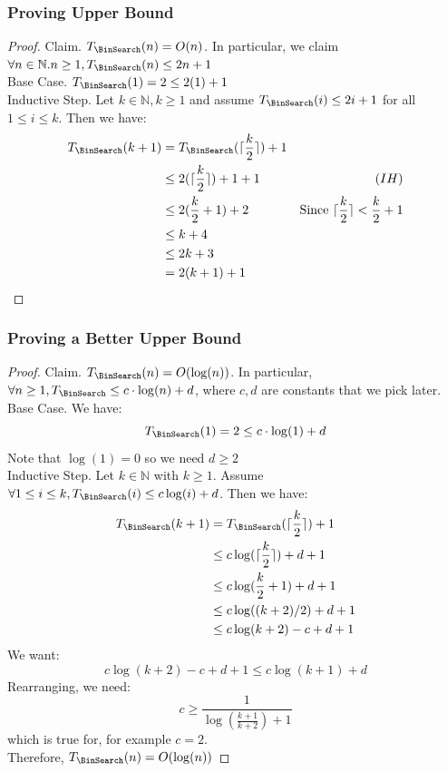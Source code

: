 \documentclass{article}
\begin{document}
\subsubsection{Proving Upper Bound}
    \begin{proof}
    Claim. $T_{\BinSearch}(n) = O(n)$. In particular, we claim $\forall n \in \mathbb{N}. n \geq 1, T_{\BinSearch}(n) \leq 2n + 1$\\
    Base Case. $T_{\BinSearch}(1) = 2 \leq 2(1) + 1$\\
    Inductive Step. Let $k \in \mathbb{N}, k \geq 1$ and assume $T_{\BinSearch}(i) \leq 2i + 1$ for all $1 \leq i \leq k$. Then we have:
    \begin{align*}
        T_{\BinSearch}(k + 1) & = T_{\BinSearch}(\lceil \frac{k}{2} \rceil ) + 1\\
        & \leq 2(\lceil \frac{k}{2} \rceil) + 1 + 1 & (IH)\\
        & \leq 2(\frac{k}{2} + 1) + 2 & \text{Since }\lceil \frac{k}{2} \rceil < \frac{k}{2} + 1\\
        & \leq k + 4\\
        & \leq 2k + 3\\
        & = 2(k + 1) + 1
    \end{align*}
    \end{proof}

\subsubsection{Proving a Better Upper Bound}
    \begin{proof}
    Claim. $T_{\BinSearch}(n) = O(\log(n))$. In particular, $\forall n \geq 1, T_{\BinSearch} \leq c \cdot \log(n) + d$, where $c, d$ are constants that we pick later.\\
    Base Case. We have:
    $$T_{\BinSearch}(1) = 2 \leq c \cdot \log(1) + d$$
    Note that $\log(1) = 0$ so we need $d \geq 2$\\
    Inductive Step. Let $k \in \mathbb{N}$ with $k \geq 1$. Assume $\forall 1 \leq i \leq k, T_{\BinSearch}(i) \leq c \log(i) + d$. Then we have:
    \begin{align*}
        T_{\BinSearch}(k + 1) & = T_{\BinSearch}(\lceil \frac{k}{2} \rceil) + 1\\
        & \leq c \log (\lceil \frac{k}{2} \rceil) + d + 1\\
        & \leq c \log(\frac{k}{2} + 1) + d + 1\\
        & \leq c \log((k + 2)/2) + d + 1\\
        & \leq c \log(k + 2) - c + d + 1
    \end{align*}
    We want:
    $$c \log(k + 2) - c + d + 1 \leq c \log(k + 1) + d$$
    Rearranging, we need:
    $$c \geq \frac{1}{\log(\frac{k + 1}{k + 2}) + 1}$$
    which is true for, for example $c = 2$.\\
    Therefore, $T_{\BinSearch}(n) = O(\log(n))$
    \end{proof}
\end{document}
